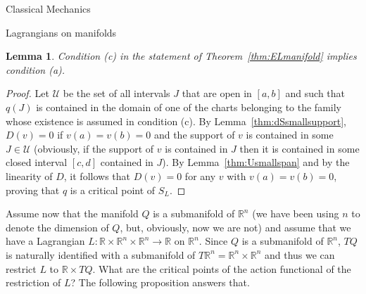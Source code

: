\documentclass[oneside,a4paper,11pt]{amsbook}
\newcommand{\R}{\mathds R}
\theoremstyle{remark}\newtheorem{exercise}{Exercise}[chapter]
\theoremstyle{plain}\newtheorem{teo}{Theorem}[section]
\theoremstyle{plain}\newtheorem{lem}[teo]{Lemma}
\theoremstyle{plain}\newtheorem{prop}[teo]{Proposition}
\theoremstyle{plain}\newtheorem{cor}[teo]{Corollary}
\theoremstyle{definition}\newtheorem{defin}[teo]{Definition}
\theoremstyle{remark}\newtheorem{rem}[teo]{Remark}
\theoremstyle{definition}\newtheorem{notation}[teo]{Notation}
\theoremstyle{definition}\newtheorem{convention}[teo]{Convention}
\theoremstyle{definition}\newtheorem{example}[teo]{Example}
\numberwithin{section}{chapter}
\numberwithin{equation}{section}
\begin{document}
\begin{chapter}{Classical Mechanics}
\begin{section}{Lagrangians on manifolds}
\begin{lem}\label{thm:ELmanifoldca}
Condition (c) in the statement of Theorem~\ref{thm:ELmanifold} implies condition (a).
\end{lem}
\begin{proof}
Let $\mathcal U$ be the set of all intervals $J$ that are open in $[a,b]$ and such that $q(J)$ is contained
in the domain of one of the charts belonging to the family whose existence is assumed in condition (c). By Lemma~\ref{thm:dSsmallsupport},
$D(v)=0$ if $v(a)=v(b)=0$ and the support of $v$ is contained in some $J\in\mathcal U$ (obviously, if the support of $v$ is contained
in $J$ then it is contained in some closed interval $[c,d]$ contained in $J$). By Lemma~\ref{thm:Usmallspan}
and by the linearity of $D$, it follows that $D(v)=0$ for any $v$ with $v(a)=v(b)=0$,
proving that $q$ is a critical point of $S_L$.
\end{proof}

Assume now that the manifold $Q$ is a submanifold of $\R^n$ (we have been using $n$ to denote the dimension
of $Q$, but, obviously, now we are not) and assume that we have a Lagrangian $L:\R\times\R^n\times\R^n\to\R$ on $\R^n$.
Since $Q$ is a submanifold of $\R^n$, $TQ$ is naturally identified with a submanifold of $T\R^n=\R^n\times\R^n$ and
thus we can restrict $L$ to $\R\times TQ$. What are the critical points of the action functional of the restriction
of $L$? The following proposition answers that.


\end{section}
\end{chapter}
\end{document}
